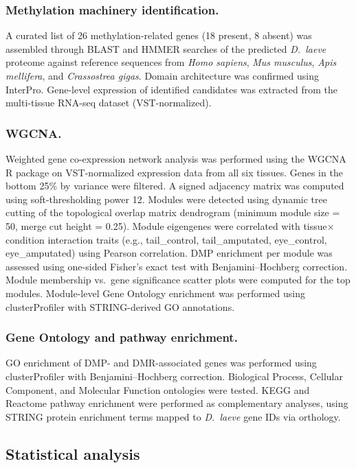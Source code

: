 \documentclass[12pt]{article}
\begin{document}
\subsubsection*{Methylation machinery identification.}
A curated list of 26 methylation-related genes (18 present, 8 absent) was assembled through BLAST and HMMER searches of the predicted \textit{D.\ laeve} proteome against reference sequences from \textit{Homo sapiens}, \textit{Mus musculus}, \textit{Apis mellifera}, and \textit{Crassostrea gigas}. Domain architecture was confirmed using InterPro. Gene-level expression of identified candidates was extracted from the multi-tissue RNA-seq dataset (VST-normalized).

\subsubsection*{WGCNA.}
Weighted gene co-expression network analysis was performed using the WGCNA R package on VST-normalized expression data from all six tissues. Genes in the bottom 25\% by variance were filtered. A signed adjacency matrix was computed using soft-thresholding power 12. Modules were detected using dynamic tree cutting of the topological overlap matrix dendrogram (minimum module size = 50, merge cut height = 0.25). Module eigengenes were correlated with tissue$\times$condition interaction traits (e.g., tail\_control, tail\_amputated, eye\_control, eye\_amputated) using Pearson correlation. DMP enrichment per module was assessed using one-sided Fisher's exact test with Benjamini--Hochberg correction. Module membership vs.\ gene significance scatter plots were computed for the top modules. Module-level Gene Ontology enrichment was performed using clusterProfiler with STRING-derived GO annotations.

\subsubsection*{Gene Ontology and pathway enrichment.}
GO enrichment of DMP- and DMR-associated genes was performed using clusterProfiler with Benjamini--Hochberg correction. Biological Process, Cellular Component, and Molecular Function ontologies were tested. KEGG and Reactome pathway enrichment were performed as complementary analyses, using STRING protein enrichment terms mapped to \textit{D.\ laeve} gene IDs via orthology.

\subsection*{Statistical analysis}
\end{document}
